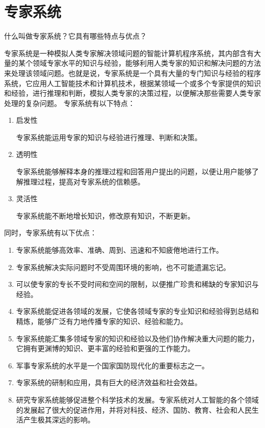 \chapter{专家系统}

\begin{question}
什么叫做专家系统？它具有哪些特点与优点？
\end{question}
\begin{solution}
专家系统是一种模拟人类专家解决领域问题的智能计算机程序系统，其内部含有大量的某个领域专家水平的知识与经验，能够利用人类专家的知识和解决问题的方法来处理该领域问题。也就是说，专家系统是一个具有大量的专门知识与经验的程序系统，它应用人工智能技术和计算机技术，根据某领域一个或多个专家提供的知识和经验，进行推理和判断，模拟人类专家的决策过程，以便解决那些需要人类专家处理的复杂问题。
专家系统有以下特点：
	\begin{enumerate}
		\item 启发性 \par
		专家系统能运用专家的知识与经验进行推理、判断和决策。
		\item 透明性 \par
		专家系统能够解释本身的推理过程和回答用户提出的问题，以便让用户能够了解推理过程，提高对专家系统的信赖感。 
		\item 灵活性 \par
		专家系统能不断地增长知识，修改原有知识，不断更新。
	\end{enumerate} \par
同时，专家系统有以下优点：
	\begin{enumerate}
		\item 专家系统能够高效率、准确、周到、迅速和不知疲倦地进行工作。
		\item 专家系统解决实际问题时不受周围环境的影响，也不可能遗漏忘记。
		\item 可以使专家的专长不受时间和空间的限制，以便推广珍贵和稀缺的专家知识与经验。
		\item 专家系统能促进各领域的发展，它使各领域专家的专业知识和经验得到总结和精炼，能够广泛有力地传播专家的知识、经验和能力。
		\item 专家系统能汇集多领域专家的知识和经验以及他们协作解决重大问题的能力，它拥有更渊博的知识、更丰富的经验和更强的工作能力。
		\item 军事专家系统的水平是一个国家国防现代化的重要标志之一。
		\item 专家系统的研制和应用，具有巨大的经济效益和社会效益。 
		\item 研究专家系统能够促进整个科学技术的发展。专家系统对人工智能的各个领域的发展起了很大的促进作用，并将对科技、经济、国防、教育、社会和人民生活产生极其深远的影响。
	\end{enumerate}
\end{solution}


